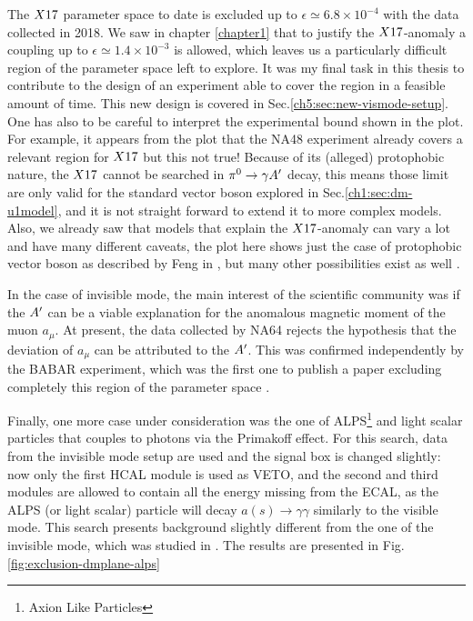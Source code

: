 The $X17$ parameter space to date is excluded up to $\epsilon \simeq 6.8 \times 10^{-4}$ with the data collected in 2018. We saw in chapter \ref{chapter1} that to justify the $X17$-anomaly a coupling up to $\epsilon \simeq 1.4 \times 10^{-3}$ is allowed, which leaves us a particularly difficult region of the parameter space left to explore. It was my final task in this thesis to contribute to the design of an experiment able to cover the region in a feasible amount of time. This new design is covered in Sec.\ref{ch5:sec:new-vismode-setup}. One has also to be careful to interpret the experimental bound shown in the plot. For example, it appears from the plot that the NA48 experiment already covers a relevant region for $X17$ but this not true! Because of its (alleged) protophobic nature, the $X17$ cannot be searched in $\pi^0 \rightarrow \gamma A'$ decay, this means those limit are only valid for the standard vector boson explored in Sec.\ref{ch1:sec:dm-u1model}, and it is not straight forward to extend it to more complex models. Also, we already saw that models that explain the $X17$-anomaly can vary a lot and have many different caveats, the plot here shows just the case of protophobic vector boson as described by Feng in \cite{Feng:2016jff}, but many other possibilities exist as well \cite{PhysRevD.95.035017}.

In the case of invisible mode, the main interest of the scientific community was if the $A'$ can be a viable explanation for the anomalous magnetic moment of the muon $a_{\mu}$. At present, the data collected by NA64 rejects the hypothesis that the deviation of $a_{\mu}$ can be attributed to the $A'$. This was confirmed independently by the BABAR experiment, which was the first one to publish a paper excluding completely this region of the parameter space \cite{PhysRevLett.119.131804}.

Finally, one more case under consideration was the one of ALPS\footnote{Axion Like Particles} and light scalar particles that couples to photons via the Primakoff effect. For this search, data from the invisible mode setup are used and the signal box is changed slightly: now only the first HCAL module is used as VETO, and the second and third modules are allowed to contain all the energy missing from the ECAL, as the ALPS (or light scalar) particle will decay $a(s) \to \gamma \gamma$ similarly to the visible mode. This search presents background slightly different from the one of the invisible mode, which was studied in \cite{Banerjee:2020fue}. The results are presented in Fig.\ref{fig:exclusion-dmplane-alps}

